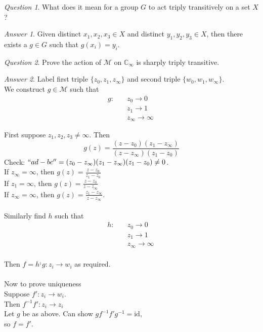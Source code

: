\documentclass[]{article}
\def\complex{\mathbb{C}}
\def\mobius{\mathcal{M}}
\theoremstyle{remark}
\theoremstyle{qnstyle}
\newtheorem{question}{Question}
\theoremstyle{answerstyle}
\newtheorem*{answer}{Answer}
\begin{document}
\begin{question}
    What does it mean for a group $G$ to act triply transitively on a set $X$?
\end{question}
\begin{answer}
    Given distinct $x_1, x_2, x_3 \in X$ and distinct $y_1, y_2, y_3 \in X$, 
    then there exists a $g \in G$ such that $g(x_i) = y_i$.
\end{answer}

\begin{question}
    Prove the action  of $\mobius$ on $\complex_\infty$ is sharply triply transitive.
\end{question}
\begin{answer}
    Label first triple $\{z_0, z_1, z_\infty \}$ and second triple $\{w_0, w_1, w_\infty\}$.\\
    We construct $g \in \mobius$ such that
    \begin{align*}
        g: \quad & z_0 \to 0 \\
                 & z_1 \to 1 \\
                 & z_\infty \to \infty \
    \end{align*}

    First suppose $z_1, z_2, z_3 \not = \infty$. Then
        $$g(z) = \frac{(z-z_0)(z_1 - z_\infty)}{(z-z_\infty)(z_1 - z_0)}$$
    Check: $``ad-bc'' = (z_0 - z_\infty)(z_1 - z_\infty)(z_1 - z_0) \not = 0$. \\
    If $z_\infty = \infty$, then $g(z) = \frac{z-z_0}{z_1-z_0}$\\
    If $z_1 = \infty$, then $g(z) = \frac{z-z_0}{z - z_\infty}$\\
    If $z_\infty = \infty$, then $g(z) = \frac{z_1 - z_\infty}{z - z_\infty}$. \\
    \\
    Similarly find $h$ such that 
    \begin{align*}
        h: \quad & z_0 \to 0 \\
                 & z_1 \to 1 \\
                 & z_\infty \to \infty \
    \end{align*} \\
    
    Then $f = h^{_1}g: z_i \to w_i$ as required. \\
    \\
    Now to prove uniqueness\\
    Suppose $f': z_i \to w_i$.\\
    Then $f^{-1}f': z_i \to z_i$\\
    Let $g$ be as above. Can show $gf^{-1} f' g^{-1} = \text{id}$, \\
    so $f = f'$.
\end{answer}
\end{document}
